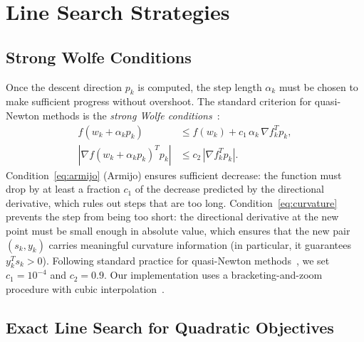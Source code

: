 \section{Line Search Strategies}
\label{sec:linesearch}

\subsection{Strong Wolfe Conditions}

\noindent Once the descent direction $p_k$ is computed, the step length $\alpha_k$
must be chosen to make sufficient progress without overshoot. The standard
criterion for quasi-Newton methods is the \emph{strong Wolfe
conditions}~\cite[Eq.~3.7]{nocedal2006numerical}:
\begin{align}
    f(w_k + \alpha_k p_k)
        &\leq f(w_k) + c_1\,\alpha_k\,\nabla f_k^T p_k,
    \label{eq:armijo} \\
    \left|\nabla f(w_k + \alpha_k p_k)^T p_k\right|
        &\leq c_2\,\left|\nabla f_k^T p_k\right|.
    \label{eq:curvature}
\end{align}
Condition~\eqref{eq:armijo} (Armijo) ensures sufficient decrease: the function
must drop by at least a fraction $c_1$ of the decrease predicted by the
directional derivative, which rules out steps that are too long.
Condition~\eqref{eq:curvature} prevents the step from being too short: the
directional derivative at the new point must be small enough in absolute value,
which ensures that the new pair $(s_k, y_k)$ carries meaningful curvature
information (in particular, it guarantees $y_k^T s_k > 0$).
Following standard practice for quasi-Newton
methods~\cite{nocedal2006numerical}, we set $c_1 = 10^{-4}$ and $c_2 = 0.9$.
Our implementation uses a bracketing-and-zoom procedure with cubic
interpolation~\cite[Section~3.4]{nocedal2006numerical}.


\subsection{Exact Line Search for Quadratic Objectives}
\label{sec:exact_ls}

